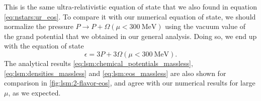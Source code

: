 This is the same ultra-relativistic equation of state that we also found in equation \eqref{eq:nstars:ur_eos}.
To compare it with our numerical equation of state, we should normalize the pressure $P \rightarrow P + \Omega(\mu<\SI{300}{\mega\electronvolt})$ using the vacuum value of the grand potential that we obtained in our general analysis.
Doing so, we end up with the equation of state
\begin{equation}
	\epsilon = 3 P + 3 \Omega(\mu<\SI{300}{\mega\electronvolt}).
\label{eq:lsm:eos_massless}
\end{equation}
The analytical results \eqref{eq:lsm:chemical_potentials_massless}, \eqref{eq:lsm:densities_massless} and \eqref{eq:lsm:eos_massless} are also shown for comparison in \cref{fig:lsm:2-flavor-eos}, and agree with our numerical results for large $\mu$, as we expected.

